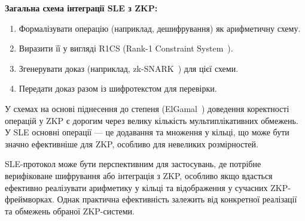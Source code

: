 \textbf{Загальна схема інтеграції SLE з ZKP:}
\begin{enumerate}
    \item Формалізувати операцію (наприклад, дешифрування) як арифметичну схему.
    \item Виразити її у вигляді R1CS (Rank-1 Constraint System~\cite{pinocchio}).
    \item Згенерувати доказ (наприклад, zk-SNARK~\cite{14, 15}) для цієї схеми.
    \item Передати доказ разом із шифротекстом для перевірки.
\end{enumerate}

У схемах на основі піднесення до степеня (ElGamal~\cite{elgamal, 12}) доведення коректності операцій у ZKP є дорогим через велику кількість мультиплікативних обмежень.
У SLE основні операції — це додавання та множення у кільці, що може бути значно ефективніше для ZKP, особливо для невеликих розмірностей.

SLE-протокол може бути перспективним для застосувань, де потрібне верифіковане шифрування або інтеграція з ZKP, особливо якщо вдасться ефективно реалізувати арифметику у кільці та відображення у сучасних ZKP-фреймворках.
Однак практична ефективність залежить від конкретної реалізації та обмежень обраної ZKP-системи.
